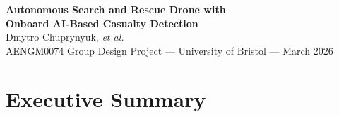\documentclass[10pt,a4paper]{article}
\begin{document}
\begin{center}
  \vspace*{2cm}
  {\LARGE\bfseries Autonomous Search and Rescue Drone with\\[3pt]
   Onboard AI-Based Casualty Detection}\\[20pt]
  {\large Dmytro Chuprynyuk, \textit{et al.}}\\[8pt]
  {\normalsize AENGM0074 Group Design Project --- University of Bristol --- March 2026}
  \vspace*{2cm}
\end{center}

\newpage
\tableofcontents

\newpage

\section*{Executive Summary}\label{sec:exec-summary}



\newpage



\newpage




\end{document}
